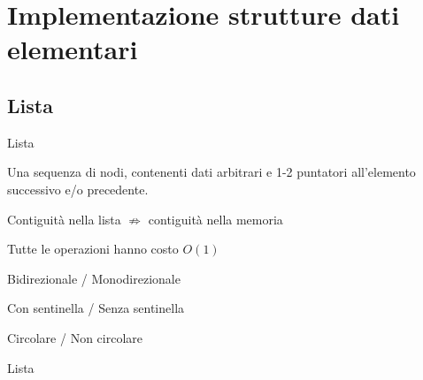 \section{Implementazione strutture dati elementari}

\subsection{Lista}

\begin{frame}{Lista}

\vspace{-6pt}
\begin{myboxtitle}
Una sequenza di nodi, contenenti dati arbitrari e 1-2 puntatori all'elemento successivo e/o precedente.
\end{myboxtitle}

\begin{myboxtitle}[Note]
\BI
\item Contiguità nella lista $\not \Rightarrow$ contiguità nella memoria
\item Tutte le operazioni hanno costo $O(1)$
\EI
\end{myboxtitle}


\begin{myboxtitle}
\BI
\item \alert{Bidirezionale} / \alert{Monodirezionale}
\item \alert{Con sentinella} / \alert{Senza sentinella}
\item \alert{Circolare} / \alert{Non circolare}  
\EI
\end{myboxtitle}

\end{frame}

\begin{frame}{Lista}
  
\begin{center}
\end{center}
\end{frame}


